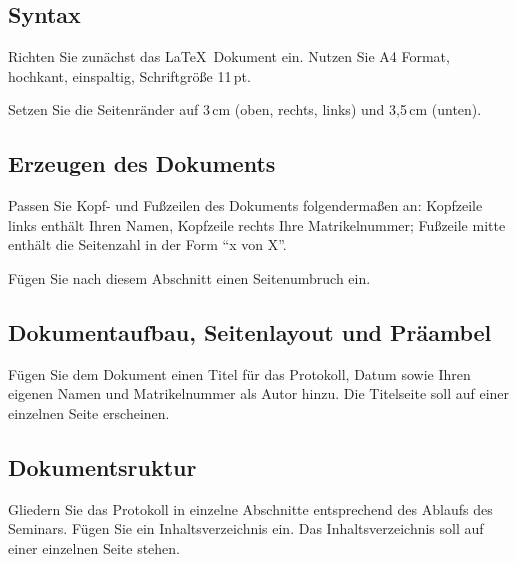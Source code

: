 \subsection{Syntax}								%

\begin{aufgabe}
Richten Sie zun\"achst das \LaTeX\ Dokument ein. Nutzen Sie A4 Format,
hochkant, einspaltig, Schriftgr\"o\ss e 11\,pt.
\end{aufgabe}	


\begin{aufgabe}
Setzen Sie die Seitenr\"ander auf 3\,cm (oben, rechts, links) und 3,5\,cm
(unten).
\end{aufgabe}

\subsection{Erzeugen des Dokuments}						%
\begin{aufgabe}
Passen Sie Kopf- und Fu\ss zeilen des Dokuments folgenderma\ss en an:
Kopfzeile links enth\"alt Ihren Namen, Kopfzeile rechts Ihre Matrikelnummer;
Fu\ss{}zeile mitte enth\"alt die Seitenzahl in der Form ``x von X''.
\end{aufgabe}


\begin{aufgabe}
F\"ugen Sie nach diesem Abschnitt einen Seitenumbruch ein.	
\end{aufgabe}

\pagebreak %


\subsection{Dokumentaufbau, Seitenlayout und Präambel}				%
\begin{aufgabe}
F\"ugen Sie dem Dokument einen Titel f\"ur das Protokoll, Datum sowie Ihren
eigenen Namen und Matrikelnummer als Autor hinzu. Die Titelseite soll auf
einer einzelnen Seite erscheinen.
\end{aufgabe}	

\subsection{Dokumentsruktur}							%
\begin{aufgabe}
Gliedern Sie das Protokoll in einzelne Abschnitte entsprechend des Ablaufs
des Seminars. F\"ugen Sie ein Inhaltsverzeichnis ein. Das Inhaltsverzeichnis
soll auf einer einzelnen Seite stehen.
\end{aufgabe}

